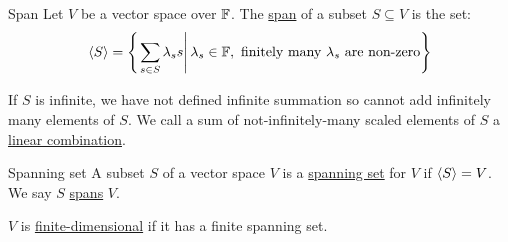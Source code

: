 \documentclass[../Main.tex]{subfiles}
\begin{document}
\begin{definition}{Span}
    Let $V$ be a vector space over $\mathbb{F}$. The \underline{span} of a subset $S \subseteq V$ is the set:
    \begin{equation*}
        \langle S \rangle = \left\{\left.\sum_{s \in S} \lambda_s s \right| \lambda_s \in \mathbb{F}, \text{ finitely many } \lambda _s \text{ are non-zero} \right\}
    \end{equation*}
\end{definition}
\begin{remark}
    If $S$ is infinite, we have not defined infinite summation so cannot add infinitely many elements of $S$. We call a sum of not-infinitely-many scaled elements of $S$ a \underline{linear combination}.
\end{remark}
\begin{definition}{Spanning set}
    A subset $S$ of a vector space $V$ is a \underline{spanning set} for $V$ if $\langle S \rangle = V$. We say $S$ \underline{spans} $V$.
\end{definition}
$V$ is \underline{finite-dimensional} if it has a finite spanning set.
\end{document}
